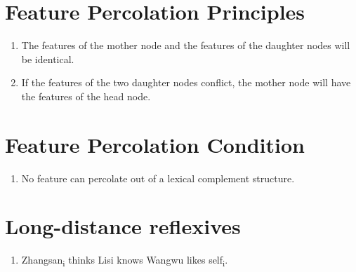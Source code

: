 
\begin{abstract}
\begin{enumerate}
  \item Introduces the core Feature Percolation Principles and one Feature Percolation Condition: daughters percolate their features to their mothers, the head daughter wins ties, and complements of lexical heads don't percolate their features
  \item Argues that the FPP explains Long-distance Reflexives and blocking effects in Chinese, Korean, Icelandic, and Italian; Non-C-Commanding Antecedents of Reflexives in Chinese and Korean, and non-c-commanding Honorific Agreement in Korean.
\end{enumerate}
\end{abstract}

\section*{Feature Percolation Principles}

\begin{enumerate}
  \item The features of the mother node and the features of the daughter nodes will be identical.
  \item If the features of the two daughter nodes conflict, the mother node will have the features of the head node.
\end{enumerate}

\section*{Feature Percolation Condition}

\begin{enumerate}[start=3]
  \item No feature can percolate out of a lexical complement structure.
\end{enumerate}

\section*{Long-distance reflexives}

\begin{enumerate}
  \item Zhangsan\textsubscript{i} thinks Lisi knows Wangwu likes self\textsubscript{i}.
\end{enumerate}

